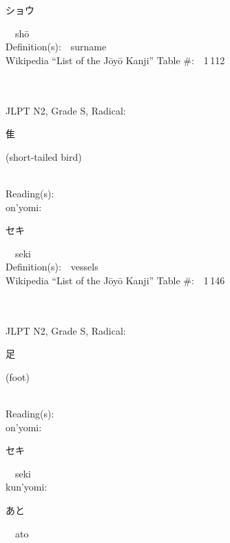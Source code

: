 \begin{multicols}{2}
{\hspace*{2em}}{\begin{CJK}{UTF8}{min} ショウ \end{CJK}}\ \ sh\=o\ \ \\
Definition(s):\ \ surname \\
Wikipedia ``List of the J\=oy\=o Kanji'' Table \#:\ \ 1\,112 \\
\ \ \\
{\fontsize{34pt}{40pt}  }\ \ \\  %
{JLPT N2, Grade S, Radical:\ \ {\begin{CJK}{UTF8}{min} 隹 \end{CJK}} (short-tailed bird) } \\
Reading(s):\ \ \\
{\hspace*{1em}}on'yomi:\ \ \\
{\hspace*{2em}}{\begin{CJK}{UTF8}{min} セキ \end{CJK}}\ \ seki\ \ \\
Definition(s):\ \ vessels \\
Wikipedia ``List of the J\=oy\=o Kanji'' Table \#:\ \ 1\,146 \\
\ \ \\
{\fontsize{34pt}{40pt}  }\ \ \\  %
{JLPT N2, Grade S, Radical:\ \ {\begin{CJK}{UTF8}{min} 足 \end{CJK}} (foot) } \\
Reading(s):\ \ \\
{\hspace*{1em}}on'yomi:\ \ \\
{\hspace*{2em}}{\begin{CJK}{UTF8}{min} セキ \end{CJK}}\ \ seki\ \ \\
{\hspace*{1em}}kun'yomi:\ \ \\
{\hspace*{2em}}{\begin{CJK}{UTF8}{min} あと \end{CJK}}\ \ ato\ \ \\

\end{multicols}
